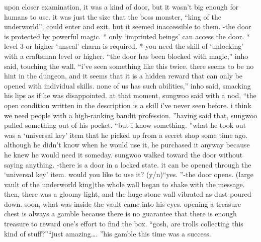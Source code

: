 upon closer examination, it was a kind of door, but it wasn’t big enough for humans to use.
it was just the size that the boss monster, “king of the underworld”, could enter and exit.
but it seemed inaccessible to them.
-the door is protected by powerful magic.
* only ‘imprinted beings’ can access the door.
* level 3 or higher ‘unseal’ charm is required.
* you need the skill of ‘unlocking’ with a craftsman level or higher.
“the door has been blocked with magic,” inho said, touching the wall.
“i’ve seen something like this twice.
 there seems to be no hint in the dungeon, and it seems that it is a hidden reward that can only be opened with individual skills.
 none of us has such abilities,” inho said, smacking his lips as if he was disappointed.
at that moment, sungwoo said with a nod, “the open condition written in the description is a skill i’ve never seen before.
 i think we need people with a high-ranking bandit profession.
”having said that, sungwoo pulled something out of his pocket.
“but i know something.
”what he took out was a ‘universal key’ item that he picked up from a secret shop some time ago.
 although he didn’t know when he would use it, he purchased it anyway because he knew he would need it someday.
sungwoo walked toward the door without saying anything.
-there is a door in a locked state.
 it can be opened through the ‘universal key’ item.
 would you like to use it? (y/n)“yes.
”-the door opens.
 (large vault of the underworld king)the whole wall began to shake with the message.
 then, there was a gloomy light, and the huge stone wall vibrated as dust poured down.
soon, what was inside the vault came into his eyes.
opening a treasure chest is always a gamble because there is no guarantee that there is enough treasure to reward one’s effort to find the box.
“gosh, are trolls collecting this kind of stuff?”“just amazing….
”his gamble this time was a success.


 